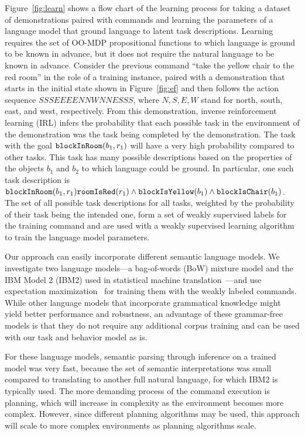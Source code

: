 \documentclass[conference]{IEEEtran}
\begin{document}
Figure~\ref{fig:learn} shows a flow chart of the learning process for taking a dataset of demonstrations paired with commands and learning the parameters of a language model that ground language to latent task descriptions. Learning requires the set of OO-MDP propositional functions to which language is ground to be known in advance, but it does not require the natural language to be known in advance. Consider the previous command ``take the yellow chair to the red room'' in the role of a training instance, paired with a demonstration that starts in the initial state shown in Figure~\ref{fig:ef} and then follows the action sequence $SSSEEEENNWNNESSS$, where $N, S, E, W$ stand for north, south, east, and west, respectively. From this demonstration, inverse reinforcement learning (IRL) infers the probability that each possible task in the environment of the demonstration was the task being completed by the demonstration. The task with the goal ${\tt blockInRoom}(b_1, r_1)$ will have a very high probability compared to other tasks. This task has many possible descriptions based on the properties of the objects $b_1$ and $b_2$ to which language could be ground. In particular, one such task description is ${\tt blockInRoom}(b_1, r_1) {\tt roomIsRed}(r_1) \land {\tt blockIsYellow}(b_1) \land {\tt blockIsChair}(b_1)$. The set of all possible task descriptions for all tasks, weighted by the probability of their task being the intended one, form a set of weakly supervised labels for the training command and are used with a weakly supervised learning algorithm to train the language model parameters.

Our approach can easily incorporate different semantic language models. We investigate two language models---a bag-of-words (BoW) mixture model and
the IBM Model 2 (IBM2) used in statistical machine translation~\cite{brown90,brown93}---and use expectation maximization~\cite{dempster77} for training them with the weakly labeled commands. While other language
models that incorporate grammatical knowledge might yield better
performance and robustness, an advantage of these grammar-free models
is that they do not require any additional corpus training and can be
used with our task and behavior model as is. 

For these language models, semantic parsing through inference on a trained model was very fast, because the set of semantic interpretations was small compared to translating to another full natural language, for which IBM2 is typically used. The more demanding process of the command execution is planning, which will increase in complexity as the environment becomes more complex. However, since different planning algorithms may be used, this approach will scale to more complex environments as planning algorithms scale. 
\end{document}
